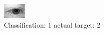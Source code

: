 \begin{figure}[h!]
\begin{center}
\includegraphics[width=0.60\columnwidth]{figures/ID360_class_1_target_2.png}
\end{center}
\caption{ Classification: 1 actual target: 2}
\label{fig:ID360_class_1_target_2}
\end{figure}
